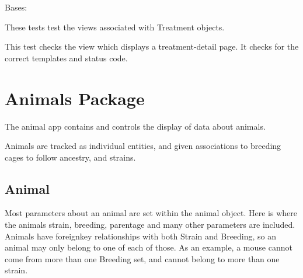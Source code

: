 \documentclass[letterpaper,10pt,english]{sphinxmanual}
\begin{document}
\begin{fulllineitems}
\label{api:data.tests.TreatmentViewTests}
Bases: 

These tests test the views associated with Treatment objects.


\begin{fulllineitems}
\label{api:data.tests.TreatmentViewTests.setUp}
\end{fulllineitems}



\begin{fulllineitems}
\label{api:data.tests.TreatmentViewTests.tearDown}
\end{fulllineitems}



\begin{fulllineitems}
\label{api:data.tests.TreatmentViewTests.test_treatment_detail}
This test checks the view which displays a treatment-detail page.  It checks for the correct templates and status code.

\end{fulllineitems}


\end{fulllineitems}



\section{Animals Package}
\label{api:animals-package}\label{api:module-animal}
The animal app contains and controls the display of data about animals.

Animals are tracked as individual entities, and given associations to breeding cages to follow ancestry, and strains.


\subsection{Animal}
\label{api:animal}
Most parameters about an animal are set within the animal object.  Here is where the animals strain, breeding, parentage and many other parameters are included.  Animals have foreignkey relationships with both Strain and Breeding, so an animal may only belong to one of each of those.  As an example, a mouse cannot come from more than one Breeding set, and cannot belong to more than one strain.
\end{document}
